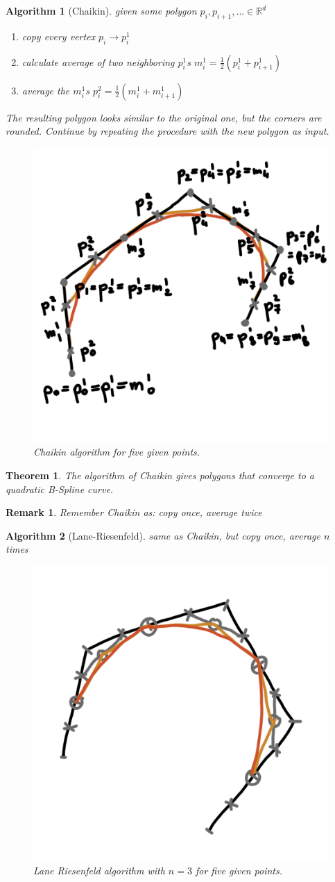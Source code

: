 \documentclass[]{article}
\newtheorem{theorem}{Theorem}
\newtheorem{algorithm}{Algorithm}
\newtheorem{remark}{Remark}
\begin{document}
\begin{algorithm}[Chaikin]
	given some polygon $p_i, p_{i+1}, ... \in \mathbb{R}^d$
	
	\begin{enumerate}
		\item copy every vertex $p_i \rightarrow p_i^1$
		\item calculate average of two neighboring $p_i^1$s $m_i^1 = \frac{1}{2}(p_i^1 + p_{i+1}^1)$
		\item average the $m_i^1$s $p_i^2 = \frac{1}{2}(m_i^1 + m_{i+1}^1)$
	\end{enumerate}
	
	The resulting polygon looks similar to the original one, but the corners are rounded. Continue by repeating the procedure with the new polygon as input.
	
	\begin{figure}[h!]
		\centering
		\includegraphics[width=0.3\linewidth]{figures/chaikin}
		\caption{Chaikin algorithm for five given points.}
		\label{fig:chaikin}
	\end{figure}
	
\end{algorithm}

\begin{theorem}
	The algorithm of Chaikin gives polygons that converge to a quadratic B-Spline curve.
\end{theorem}

\begin{remark}
	Remember Chaikin as: copy once, average twice
\end{remark}

\begin{algorithm}[Lane-Riesenfeld]
	same as Chaikin, but copy once, average $n$ times
	
	\begin{figure}[h!]
		\centering
		\includegraphics[width=0.3\linewidth]{figures/lane_riesenfeld}
		\caption{Lane Riesenfeld algorithm with $n=3$ for five given points.}
		\label{fig:lane_riesenfeld}
	\end{figure}
\end{algorithm}
\end{document}
